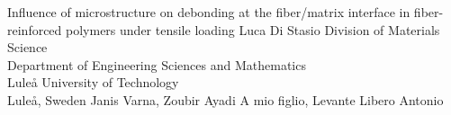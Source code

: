 \documentclass[12pt,a4paper,openright,final,twoside]{msethesis}
\begin{document}
\newrefsection

\def\thesistitle{Influence of microstructure on debonding at the fiber/matrix interface in fiber-reinforced polymers under tensile loading}
\def\theauthor{Luca Di Stasio}
\def\theaddress{Division of Materials Science\\Department of Engineering Sciences and Mathematics\\
Lule{\aa} University of Technology\\ Lule{\aa}, Sweden}

\def\supervisors{Janis Varna, Zoubir Ayadi}
\def\supervisorstring{Supervisors:} %
\def\dedication{A mio figlio, Levante Libero Antonio}

\def\theabstract{}
\def\thepreface{}



\def\thelogo{} %


\startpreamble
  {\thesistitle}
  {\theauthor}
  {\theaddress}
  {\supervisors}
  {\dedication}
  {\theabstract}
  {\thepreface}
  {\thelogo}


\startchapters

%
%
\end{document}
